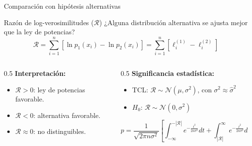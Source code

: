 \documentclass[aspectratio=169, 11pt, xcolor=table]{beamer}
\begin{document}
	\begin{frame}{Comparación con hipótesis alternativas}
		\begin{block}{Razón de log-verosimilitudes ($\mathcal{R}$)}
			¿Alguna distribución alternativa se ajusta mejor que la ley de potencias?
			\begin{equation*}
			\mathcal{R} = \sum_{i=1}^{n} [\ln p_1(x_i) - \ln p_2(x_i)] = \sum_{i=1}^{n} [\ell_i^{(1)} - \ell_i^{(2)}]
			\end{equation*}
		\end{block}
		
		\begin{columns}[t]
			\begin{column}{0.5\textwidth}
				\textbf{Interpretación:}
				\begin{itemize}
					\item $\mathcal{R} > 0$: ley de potencias favorable.
					\item $\mathcal{R} < 0$: alternativa favorable.
					\item $\mathcal{R} \approx 0$: no distinguibles.
				\end{itemize}
			\end{column}
			
			\begin{column}{0.5\textwidth}
				\textbf{Significancia estadística:}
				\footnotesize
				\begin{itemize}
					\item TCL: $\mathcal{R} \sim \mathcal{N}(\mu, \sigma^2)$, con $\sigma^2 \approx \hat{\sigma}^2$
					\item $H_0$: $\mathcal{R} \sim \mathcal{N}(0, \sigma^2)$
				\end{itemize}
				\begin{equation*}
				p = \frac{1}{\sqrt{2\pi n\sigma^2}} \left[ \int_{-\infty}^{-|\mathcal{R}|} e^{-\frac{t^2}{2n\sigma^2}} dt + \int_{|\mathcal{R}|}^{\infty} e^{-\frac{t^2}{2n\sigma^2}} dt \right]
				\end{equation*}
			\end{column}
		\end{columns}
	\end{frame}
	
\end{document}
